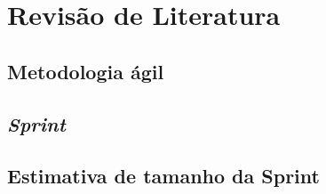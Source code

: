 \chapter{Revisão de Literatura}

  \section{Metodologia ágil}
  
  \section{\textit{Sprint}}
  
  \section{Estimativa de tamanho da Sprint}